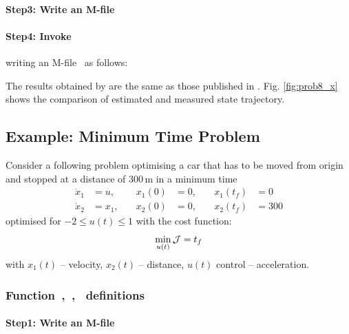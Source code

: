 {\small }

\paragraph{Step3: Write an M-file~}

{\small }

\paragraph{Step4: Invoke~} writing an
M-file~ as follows:

{\small }

The results obtained by  are the same as those published
in \cite{fik02}. Fig. \ref{fig:prob8_x} shows the comparison of
estimated and measured state trajectory. 

\subsection{Example: Minimum Time Problem}
\label{sec:car}

Consider a following problem optimising a car that has to be moved
from origin and stopped at a distance of 300\,m in a minimum time
\begin{align}
\dot{x}_1 &= u, \quad  &x_{1}(0) &= 0 , \quad  &x_{1}(t_f) &= 0 \\
\dot{x}_2 &= x_{1}, \quad &x_{2}(0) &= 0, \quad  &x_{2}(t_f) &= 300  
\end{align} 
optimised for $-2 \leq u(t) \leq 1$ with the cost function:
\begin{equation} \label{eq:car}
\min_{u(t)} \mathcal{J} = t_{f} 
\end{equation} 
with $x_1(t)$ -- velocity, $x_2(t)$ -- distance, $u(t)$ control --
acceleration.

\subsubsection{Function~,~,~  definitions}
\label{sec:car-fundef}

\paragraph{Step1: Write an M-file~}

